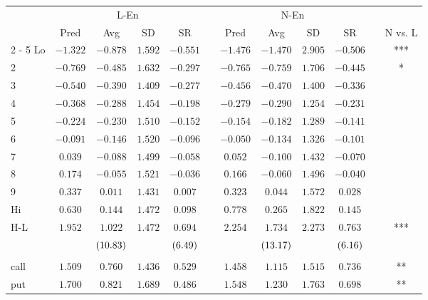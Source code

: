 \begin{tabular}{@{}lccccccccccc@{}}%
\toprule%
&\multicolumn{4}{c}{L{-}En}&&\multicolumn{4}{c}{N{-}En}&&\\%
\multicolumn{1}{c}{}&\multicolumn{1}{c}{Pred}&\multicolumn{1}{c}{Avg}&\multicolumn{1}{c}{SD}&\multicolumn{1}{c}{SR}&\multicolumn{1}{c}{}&\multicolumn{1}{c}{Pred}&\multicolumn{1}{c}{Avg}&\multicolumn{1}{c}{SD}&\multicolumn{1}{c}{SR}&\multicolumn{1}{c}{}&\multicolumn{1}{c}{N vs. L}\\%
\cmidrule{2%
-%
5}%
\cmidrule{7%
-%
10}%
\cmidrule{12%
-%
12}%
Lo&$-1.322$&$-0.878$&$1.592$&$-0.551$&&$-1.476$&$-1.470$&$2.905$&$-0.506$&&***\\%
2&$-0.769$&$-0.485$&$1.632$&$-0.297$&&$-0.765$&$-0.759$&$1.706$&$-0.445$&&*\\%
3&$-0.540$&$-0.390$&$1.409$&$-0.277$&&$-0.456$&$-0.470$&$1.400$&$-0.336$&&\\%
4&$-0.368$&$-0.288$&$1.454$&$-0.198$&&$-0.279$&$-0.290$&$1.254$&$-0.231$&&\\%
5&$-0.224$&$-0.230$&$1.510$&$-0.152$&&$-0.154$&$-0.182$&$1.289$&$-0.141$&&\\%
6&$-0.091$&$-0.146$&$1.520$&$-0.096$&&$-0.050$&$-0.134$&$1.326$&$-0.101$&&\\%
7&$0.039$&$-0.088$&$1.499$&$-0.058$&&$0.052$&$-0.100$&$1.432$&$-0.070$&&\\%
8&$0.174$&$-0.055$&$1.521$&$-0.036$&&$0.166$&$-0.060$&$1.496$&$-0.040$&&\\%
9&$0.337$&$0.011$&$1.431$&$0.007$&&$0.323$&$0.044$&$1.572$&$0.028$&&\\%
Hi&$0.630$&$0.144$&$1.472$&$0.098$&&$0.778$&$0.265$&$1.822$&$0.145$&&\\%
\midrule%
H{-}L&$1.952$&$1.022$&$1.472$&$0.694$&&$2.254$&$1.734$&$2.273$&$0.763$&&***\\%
&&$\footnotesize{(10.83)}$&&$\footnotesize{(6.49)}$&&&$\footnotesize{(13.17)}$&&$\footnotesize{(6.16)}$&&\\%
&&&&&&&&&&&\\%
call&$1.509$&$0.760$&$1.436$&$0.529$&&$1.458$&$1.115$&$1.515$&$0.736$&&**\\%
put&$1.700$&$0.821$&$1.689$&$0.486$&&$1.548$&$1.230$&$1.763$&$0.698$&&**\\\bottomrule%
%
\end{tabular}